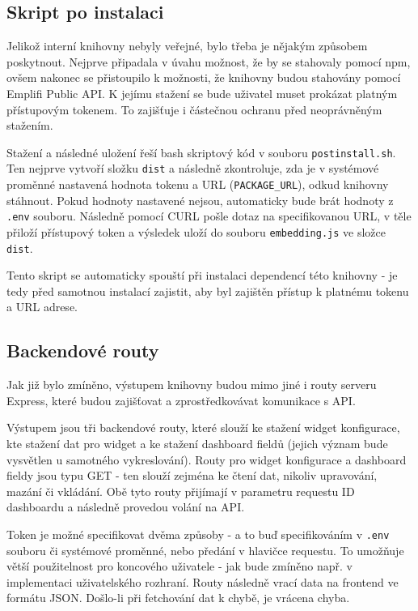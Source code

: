 \documentclass[czech, bc, kiv, he, iso690numb]{fasthesis}
\begin{document}
\subsection{Skript po instalaci}

Jelikož interní knihovny nebyly veřejné, bylo třeba je nějakým způsobem poskytnout. Nejprve připadala v úvahu možnost, že by se stahovaly pomocí npm, ovšem
nakonec se přistoupilo k možnosti, že knihovny budou stahovány pomocí Emplifi Public API. K jejímu stažení se bude uživatel muset prokázat platným přístupovým tokenem.
To zajišťuje i částečnou ochranu před neoprávněným stažením.

Stažení a následné uložení řeší bash skriptový kód v souboru \texttt{postinstall.sh}. Ten nejprve vytvoří složku \texttt{dist} a následně zkontroluje, zda je v systémové proměnné
nastavená hodnota tokenu a URL (\texttt{PACKAGE\_URL}), odkud knihovny stáhnout. Pokud hodnoty nastavené nejsou, automaticky bude brát hodnoty z \texttt{.env} souboru. Následně pomocí CURL pošle dotaz na
specifikovanou URL, v těle přiloží přístupový token a výsledek uloží do souboru \texttt{embedding.js} ve složce \texttt{dist}.

Tento skript se automaticky spouští při instalaci dependencí této knihovny - je tedy před samotnou instalací zajistit, aby byl zajištěn přístup k platnému tokenu a URL adrese.

\subsection{Backendové routy}

Jak již bylo zmíněno, výstupem knihovny budou mimo jiné i routy serveru Express, které budou zajišťovat a zprostředkovávat komunikace s API.

Výstupem jsou tři backendové routy, které slouží ke stažení widget konfigurace, kte stažení dat pro widget a ke stažení dashboard fieldů (jejich význam bude vysvětlen u samotného vykreslování).
Routy pro widget konfigurace a dashboard fieldy jsou typu GET - ten slouží zejména ke čtení dat, nikoliv upravování, mazání či vkládání. Obě tyto routy přijímají v parametru requestu ID
dashboardu a následně provedou volání na API. 

Token je možné specifikovat dvěma způsoby - a to buď specifikováním v \texttt{.env} souboru či systémové proměnné, nebo předání v hlavičce requestu. To umožňuje větší použitelnost pro koncového
uživatele - jak bude zmíněno např. v implementaci uživatelského rozhraní. Routy následně vrací data na frontend ve formátu JSON. Došlo-li při fetchování dat k chybě, je vrácena chyba.
\end{document}
